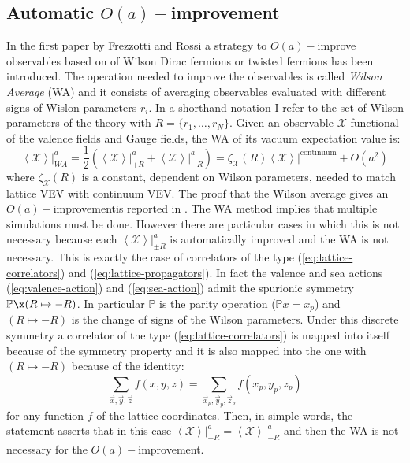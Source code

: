 \documentclass[english, LaM, oneside, noexaminfo]{sapthesis}
\newcommand{\la}{\langle}
\newcommand{\ra}{\rangle}
\newcommand{\oait}{$O(a)-$improvement}
\begin{document}
\subsection{Automatic \oait}
\noindent
In the first paper by Frezzotti and Rossi \cite{FR1} a strategy to $O(a)-$improve observables based on of Wilson Dirac fermions or twisted fermions has been introduced.
The operation needed to improve the observables is called \textit{Wilson Average} (WA) and it consists of averaging observables evaluated with different signs of Wislon parameters $r_i$.
In a shorthand notation I refer to the set of Wilson parameters of the theory with $R = \{r_1,\dots,r_N\}$.
\newline
Given an observable $\mathcal{X}$ functional of the valence fields and Gauge fields, the WA of its vacuum expectation value is:
\begin{equation*}
    \left\la \mathcal{X} \right\ra\Big|_{WA}^a = \frac{1}{2}\left( \left\la \mathcal{X} \right\ra\Big|_{+R}^a + \left\la \mathcal{X} \right\ra\Big|_{-R}^a\right) 
    = \zeta_\mathcal{X}(R)  \left\la \mathcal{X} \right\ra\Big|^\text{continuum} + O(a^2)
\end{equation*}
where $\zeta_\mathcal{X}(R)$ is a constant, dependent on Wilson parameters, needed to match lattice VEV with continuum VEV.
The proof that the Wilson average gives an \oait\space is reported in \cite{FR1}. 
\newline
The WA method implies that multiple simulations must be done.
However there are particular cases in which this is not necessary because each $\left\la \mathcal{X} \right\ra\big|_{\pm R}^a$ is automatically improved and the WA is not necessary.
This is exactly the case of correlators of the type (\ref{eq:lattice-correlators}) and (\ref{eq:lattice-propagators}).
In fact the valence and sea actions (\ref{eq:valence-action}) and (\ref{eq:sea-action}) admit the spurionic symmetry $\mathbb{P}\x (R\mapsto -R)$.
In particular $\mathbb{P}$ is the parity operation ($\mathbb{P}x = x_p$) and $(R\mapsto -R)$ is the change of signs of the Wilson parameters.
Under this discrete symmetry a correlator of the type (\ref{eq:lattice-correlators}) is mapped into itself because of the symmetry property and it is also mapped into the one with $(R\mapsto -R)$ because of the identity:
\begin{equation*}
    \sum_{\vec x, \vec y, \vec z} f(x,y,z) =  \sum_{\vec x_p, \vec y_p, \vec z_p} f(x_p,y_p,z_p)
\end{equation*}
for any function $f$ of the lattice coordinates.
Then, in simple words, the statement asserts that in this case $\left\la \mathcal{X} \right\ra\big|_{+R}^a = \left\la \mathcal{X} \right\ra\big|_{-R}^a$ and then the WA is not necessary for the \oait.
\end{document}
